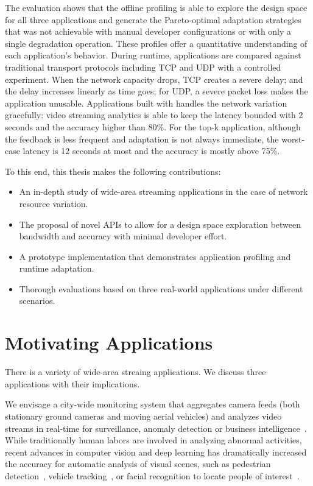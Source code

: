 \documentclass[thesis.tex]{subfiles}
\begin{document}
The evaluation shows that the offline profiling is able to explore the design
space for all three applications and generate the Pareto-optimal adaptation
strategies that was not achievable with manual developer configurations or with
only a single degradation operation. These profiles offer a quantitative
understanding of each application's behavior. During runtime, \sysname{}
applications are compared against traditional transport protocols including TCP
and UDP with a controlled experiment. When the network capacity drops, TCP
creates a severe delay; and the delay increases linearly as time goes; for UDP,
a severe packet loss makes the application unusable. Applications built with
\sysname{} handles the network variation gracefully: video streaming analytics
is able to keep the latency bounded with 2 seconds and the accuracy higher than
80\%. For the top-k application, although the feedback is less frequent and
adaptation is not always immediate, the worst-case latency is 12 seconds at most
and the accuracy is mostly above 75\%.

To this end, this thesis makes the following contributions:

\begin{itemize}
\item An in-depth study of wide-area streaming applications in the case of
  network resource variation.
\item The proposal of novel APIs to allow for a design space exploration between
  bandwidth and accuracy with minimal developer effort.
\item A prototype implementation that demonstrates application profiling and
  runtime adaptation.
\item Thorough evaluations based on three real-world applications under
  different scenarios.
\end{itemize}

\section{Motivating Applications}
\label{sec:motiv-appl}

There is a variety of wide-area streaing applications. We discuss three
applications with their implications.

 We envisage a city-wide monitoring system that
aggregates camera feeds (both stationary ground cameras and moving aerial
vehicles) and analyzes video streams in real-time for surveillance, anomaly
detection or business intelligence~\cite{oh2011large}. While traditionally human
labors are involved in analyzing abnormal activities, recent advances in
computer vision and deep learning has dramatically increased the accuracy for
automatic analysis of visual scenes, such as pedestrian
detection~\cite{dollar2012pedestrian}, vehicle tracking~\cite{coifman1998real},
or facial recognition to locate people of
interest~\cite{Lu:2015:SHF:2888116.2888245, parkhi2015deep}.
\end{document}
